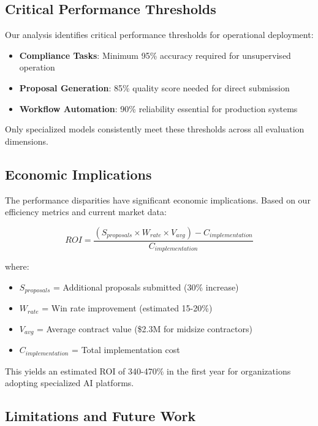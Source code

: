 \documentclass[11pt,a4paper]{article}
\begin{document}
\subsection{Critical Performance Thresholds}

Our analysis identifies critical performance thresholds for operational deployment:

\begin{itemize}
    \item \textbf{Compliance Tasks}: Minimum 95\% accuracy required for unsupervised operation
    \item \textbf{Proposal Generation}: 85\% quality score needed for direct submission
    \item \textbf{Workflow Automation}: 90\% reliability essential for production systems
\end{itemize}

Only specialized models consistently meet these thresholds across all evaluation dimensions.

\subsection{Economic Implications}

The performance disparities have significant economic implications. Based on our efficiency metrics and current market data:

\begin{equation}
ROI = \frac{(S_{proposals} \times W_{rate} \times V_{avg}) - C_{implementation}}{C_{implementation}}
\end{equation}

where:
\begin{itemize}
    \item $S_{proposals}$ = Additional proposals submitted (30\% increase)
    \item $W_{rate}$ = Win rate improvement (estimated 15-20\%)
    \item $V_{avg}$ = Average contract value (\$2.3M for midsize contractors)
    \item $C_{implementation}$ = Total implementation cost
\end{itemize}

This yields an estimated ROI of 340-470\% in the first year for organizations adopting specialized AI platforms.

\subsection{Limitations and Future Work}
\end{document}
